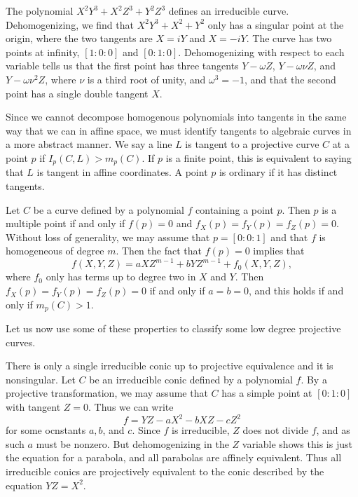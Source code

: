 \begin{example}
    The polynomial $X^2Y^3 + X^2Z^3 + Y^2Z^3$ defines an irreducible curve. Dehomogenizing, we find that $X^2Y^3 + X^2 + Y^2$ only has a singular point at the origin, where the two tangents are $X = iY$ and $X = -iY$. The curve has two points at infinity, $[1:0:0]$ and $[0:1:0]$. Dehomogenizing with respect to each variable tells us that the first point has three tangents $Y - \omega Z$, $Y - \omega \nu Z$, and $Y - \omega \nu^2 Z$, where $\nu$ is a third root of unity, and $\omega^3 = -1$, and that the second point has a single double tangent $X$.
\end{example}

Since we cannot decompose homogenous polynomials into tangents in the same way that we can in affine space, we must identify tangents to algebraic curves in a more abstract manner. We say a line $L$ is tangent to a projective curve $C$ at a point $p$ if $I_p(C,L) > m_p(C)$. If $p$ is a finite point, this is equivalent to saying that $L$ is tangent in affine coordinates. A point $p$ is ordinary if it has distinct tangents.

\begin{example}
    Let $C$ be a curve defined by a polynomial $f$ containing a point $p$. Then $p$ is a multiple point if and only if $f(p) = 0$ and $f_X(p) = f_Y(p) = f_Z(p) = 0$. Without loss of generality, we may assume that $p = [0:0:1]$ and that $f$ is homogeneous of degree $m$. Then the fact that $f(p) = 0$ implies that
    \[ f(X,Y,Z) = aXZ^{m-1} + bYZ^{m-1} + f_0(X,Y,Z), \]
    where $f_0$ only has terms up to degree two in $X$ and $Y$. Then $f_X(p) = f_Y(p) = f_Z(p) = 0$ if and only if $a = b = 0$, and this holds if and only if $m_p(C) > 1$.
\end{example}

Let us now use some of these properties to classify some low degree projective curves.

\begin{example}
    There is only a single irreducible conic up to projective equivalence and it is nonsingular. Let $C$ be an irreducible conic defined by a polynomial $f$. By a projective transformation, we may assume that $C$ has a simple point at $[0:1:0]$ with tangent $Z = 0$. Thus we can write
    \[ f = YZ - aX^2 - bXZ - cZ^2 \]
    for some ocnstants $a,b$, and $c$. Since $f$ is irreducible, $Z$ does not divide $f$, and as such $a$ must be nonzero. But dehomogenizing in the $Z$ variable shows this is just the equation for a parabola, and all parabolas are affinely equivalent. Thus all irreducible conics are projectively equivalent to the conic described by the equation $YZ = X^2$.
\end{example}

